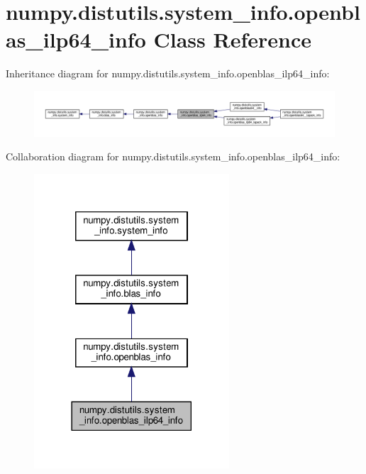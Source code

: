 \hypertarget{classnumpy_1_1distutils_1_1system__info_1_1openblas__ilp64__info}{}\section{numpy.\+distutils.\+system\+\_\+info.\+openblas\+\_\+ilp64\+\_\+info Class Reference}
\label{classnumpy_1_1distutils_1_1system__info_1_1openblas__ilp64__info}


Inheritance diagram for numpy.\+distutils.\+system\+\_\+info.\+openblas\+\_\+ilp64\+\_\+info\+:
\nopagebreak
\begin{figure}[H]
\begin{center}
\leavevmode
\includegraphics[width=350pt]{classnumpy_1_1distutils_1_1system__info_1_1openblas__ilp64__info__inherit__graph}
\end{center}
\end{figure}


Collaboration diagram for numpy.\+distutils.\+system\+\_\+info.\+openblas\+\_\+ilp64\+\_\+info\+:
\nopagebreak
\begin{figure}[H]
\begin{center}
\leavevmode
\includegraphics[width=206pt]{classnumpy_1_1distutils_1_1system__info_1_1openblas__ilp64__info__coll__graph}
\end{center}
\end{figure}
